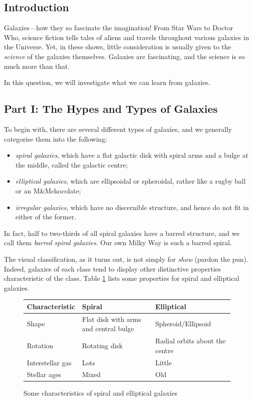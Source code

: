 \documentclass[a4paper,11pt]{exam}
\begin{document}
\subsection*{Introduction}
Galaxies---how they so fascinate the imagination! From Star Wars to Doctor Who, science fiction tells tales of aliens and travels throughout various galaxies in the Universe. Yet, in these shows, little consideration is usually given to the \textit{science} of the galaxies themselves. Galaxies are fascinating, and the science is so much more than that.

In this question, we will investigate what we can learn from galaxies.

\subsection*{Part I: The Hypes and Types of Galaxies}

To begin with, there are several different types of galaxies, and we generally categorise them into the following:
\begin{itemize}
	\item \textit{spiral galaxies}, which have a flat galactic disk with spiral arms and a bulge at the middle, called the galactic centre;
	\item \textit{elliptical galaxies}, which are ellipsoidal or spheroidal, rather like a rugby ball or an M\&M\texttrademark chocolate;
	\item \textit{irregular galaxies}, which have no discernible structure, and hence do not fit in either of the former.
\end{itemize}
In fact, half to two-thirds of all spiral galaxies have a barred structure, and we call them \textit{barred spiral galaxies}. Our own Milky Way is such a barred spiral.

The visual classification, as it turns out, is not simply for \textit{show} {\footnotesize(pardon the pun)}. Indeed, galaxies of each class tend to display other distinctive properties characteristic of the class. Table \ref{5a} lists some properties for spiral and elliptical galaxies.
\begin{figure}[H]
	\centering
	\begin{tabularx}{0.8\textwidth}{@{}lXX@{}}
		\toprule
		\textbf{Characteristic} & \textbf{Spiral} & \textbf{Elliptical}\\ \midrule
		Shape & Flat disk with arms and central bulge & Spheroid/Ellipsoid\\
		Rotation & Rotating disk & Radial orbits about the centre\\
		Interstellar gas & Lots & Little\\
		Stellar ages & Mixed & Old\\
		\bottomrule
	\end{tabularx}
	\renewcommand{\figurename}{Table}
	\caption{Some characteristics of spiral and elliptical galaxies}
	\label{5a}
\end{figure}
\end{document}
